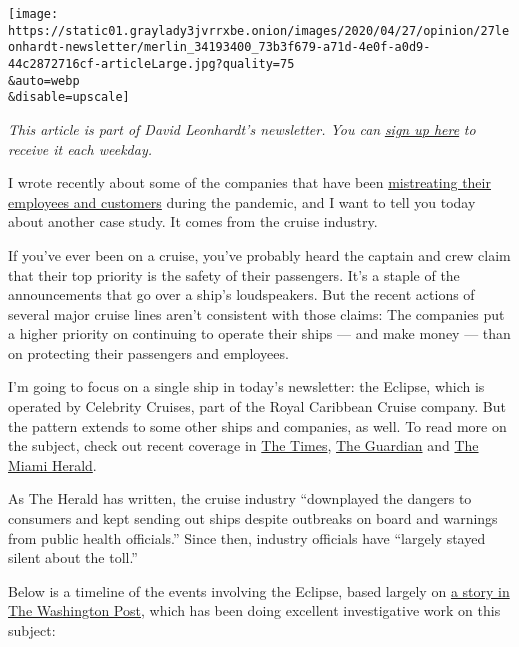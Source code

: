 \texttt{[image: https://static01.graylady3jvrrxbe.onion/images/2020/04/27/opinion/27leonhardt-newsletter/merlin\_34193400\_73b3f679-a71d-4e0f-a0d9-44c2872716cf-articleLarge.jpg?quality=75\\\&auto=webp\\\&disable=upscale]}

\emph{This article is part of David Leonhardt's newsletter. You can}
\href{https://www.nytimes3xbfgragh.onion/newsletters/opiniontoday?action=click\&module=Intentional\&pgtype=Article}{\emph{sign
up here}} \emph{to receive it each weekday.}

I wrote recently about some of the companies that have been
\href{https://www.nytimes3xbfgragh.onion/2020/04/17/opinion/business-coronavirus.html}{mistreating
their employees and customers} during the pandemic, and I want to tell
you today about another case study. It comes from the cruise industry.

If you've ever been on a cruise, you've probably heard the captain and
crew claim that their top priority is the safety of their passengers.
It's a staple of the announcements that go over a ship's loudspeakers.
But the recent actions of several major cruise lines aren't consistent
with those claims: The companies put a higher priority on continuing to
operate their ships --- and make money --- than on protecting their
passengers and employees.

I'm going to focus on a single ship in today's newsletter: the Eclipse,
which is operated by Celebrity Cruises, part of the Royal Caribbean
Cruise company. But the pattern extends to some other ships and
companies, as well. To read more on the subject, check out recent
coverage in
\href{https://www.nytimes3xbfgragh.onion/2020/03/27/us/coronavirus-cruise-ships-zandaam.html}{The
Times},
\href{https://www.theguardian.com/environment/2020/apr/09/revealed-6000-passengers-on-cruise-ships-at-sea-despite-coronavirus-crisis}{The
Guardian} and
\href{https://www.miamiherald.com/news/business/tourism-cruises/article241640166.html}{The
Miami Herald}.

As The Herald has written, the cruise industry ``downplayed the dangers
to consumers and kept sending out ships despite outbreaks on board and
warnings from public health officials.'' Since then, industry officials
have ``largely stayed silent about the toll.''

Below is a timeline of the events involving the Eclipse, based largely
on
\href{https://www.washingtonpost.com/graphics/2020/politics/cruise-ships-coronavirus/?nid=top_pb_signin}{a
story in The Washington Post}, which has been doing excellent
investigative work on this subject:


